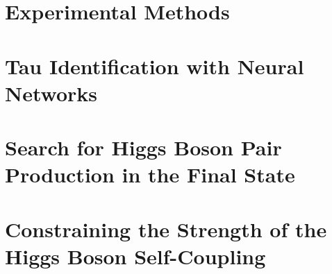 \documentclass[PhD, UKenglish]{scrbook}
\begin{document}
\chapter{Experimental Methods}%
\label{sec:experimental_methods}




\chapter{Tau Identification with Neural Networks}%
\label{sec:tauid}






\chapter{Search for Higgs Boson Pair Production in the \bbtautau Final
  State}%
\label{sec:dihiggs}











\chapter{Constraining the Strength of the Higgs Boson Self-Coupling}%
\label{sec:higgs_self_coupling}

\end{document}
